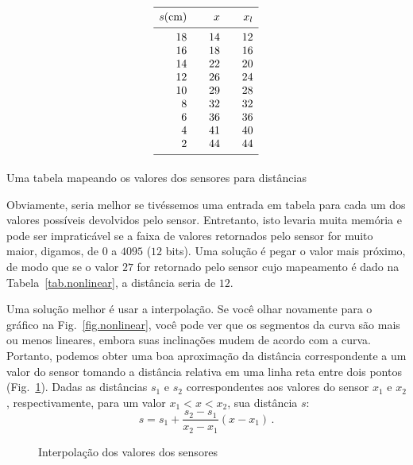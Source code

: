 {\begin{table}
\begin{displaymath}
\begin{array}{r@{\hspace{2em}}r@{\hspace{2em}}r}
\hline\noalign{\smallskip}
s \textrm{(cm)} & x & x_l\\
\noalign{\smallskip}\hline\noalign{\smallskip}
18 &14 & 12\\
16 &18 & 16\\
 14&22 & 20\\
 12&26 & 24\\
 10&29 & 28\\
 8 &32 & 32\\
 6 &36 & 36\\
 4 &41 & 40\\
 2 &44 & 44\\
\noalign{\smallskip}\hline\noalign{\smallskip}
\end{array}
\end{displaymath}
\caption{Uma tabela mapeando os valores dos sensores para distâncias}\label{tab.nonlinear}
\end{table}
Obviamente, seria melhor se tivéssemos uma entrada em tabela para cada um dos valores possíveis devolvidos pelo sensor. Entretanto, isto levaria muita memória e pode ser impraticável se a faixa de valores retornados pelo sensor for muito maior, digamos, de $0$ a $4095$ ($12$ bits). Uma solução é pegar o valor mais próximo, de modo que se o valor $27$ for retornado pelo sensor cujo mapeamento é dado na Tabela~\ref{tab.nonlinear}, a distância seria de $12$.

Uma solução melhor é usar a interpolação. Se você olhar novamente para o gráfico na Fig.~\ref{fig.nonlinear}, você pode ver que os segmentos da curva são mais ou menos lineares, embora suas inclinações mudem de acordo com a curva. Portanto, podemos obter uma boa aproximação da distância correspondente a um valor do sensor tomando a distância relativa em uma linha reta entre dois pontos (Fig.~\ref{fig.interpolation}). Dadas as distâncias $s_1$ e $s_2$ correspondentes aos valores do sensor $x_1$ e $x_2$, respectivamente, para um valor $x_1<x<x_2$, sua distância $s$:
\[
s = s_1 + \frac{s_2-s_1}{x_2-x_1}(x-x_1)\,.
\]

\begin{figure}
\begin{center}
\caption{Interpolação dos valores dos sensores}\label{fig.interpolation}
\end{center}
\end{figure}

}
